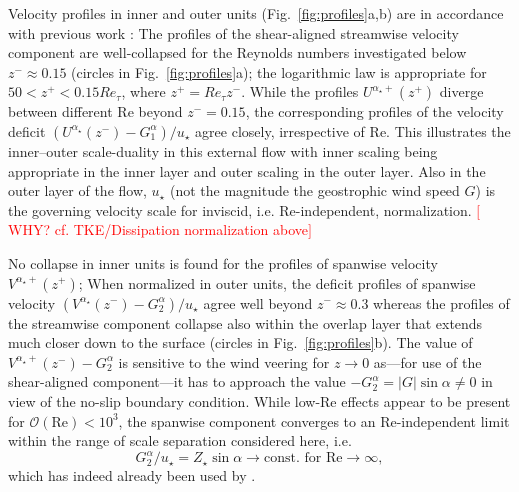 \documentclass[a4paper,11pt]{amsart}
\newcommand{\todo}[1]{\textcolor{red}{$[$#1$]$}}
\newcommand{\RE}{\mathrm{Re}}
\begin{document}
%
\par
%
Velocity profiles in inner and outer units (Fig.~\ref{fig:profiles}a,b) are in accordance
with previous work \citep{coleman:JFM1992,spalart:PF2008,spalart:PF2009,ansorge:BM2014,ansorge:BM2019}:
%
The profiles of the shear-aligned streamwise velocity component are well-collapsed for the Reynolds
numbers investigated below $z^-\approx 0.15$ (circles in Fig.~\ref{fig:profiles}a); the logarithmic
law is appropriate for $50 < z^+ < 0.15 Re_\tau$, where $z^+ = Re_\tau z^-$.
%
While the profiles $U^{\alpha_\star+}(z^+)$ diverge between different $\RE$ beyond $z^-=0.15$,
the corresponding profiles of the velocity deficit  $(U^{\alpha_\star}(z^-) - G_{1}^{\alpha} ) /u_\star$
agree closely, irrespective of $\RE$.
%
This illustrates the inner--outer scale-duality in this external flow with inner scaling being
appropriate in the inner layer and outer scaling in the outer layer. 
%
Also in the outer layer of the flow, $u_\star$ (not the magnitude the
geostrophic wind speed $G$) is the governing velocity scale for inviscid, i.e. $\RE$-independent,
normalization. \todo{WHY? cf. TKE/Dissipation normalization above}
%
\par
%
No collapse in inner units is found for the profiles of spanwise velocity $V^{\alpha_\star+}(z^+)$;
%
When normalized in outer units, the deficit profiles of spanwise velocity
$(V^{\alpha_\star}(z^-)-G_{2}^{\alpha})/u_\star$
agree well beyond $z^-\approx 0.3$ whereas the profiles of the streamwise component collapse also
within the overlap layer that extends much closer down to the surface
(circles in Fig.~\ref{fig:profiles}b).
%
The value of $V^{\alpha_\star+}(z^-)-G_{2}^{\alpha}$ is sensitive to the wind veering for
$z\rightarrow 0$ as---for use of the shear-aligned component---it has to approach the value
$-G_2^\alpha=|G|\sin\alpha\ne0$ in view of the no-slip boundary condition.  
%
While low-$\RE$ effects appear to be present for $\mathcal{O}(\RE)<10^3$, the spanwise component
converges to an $\RE$-independent limit within the range of scale separation considered
here, i.e.
\begin{equation}
  G_{2}^{\alpha}/u_\star = Z_\star \sin\alpha \rightarrow \text{const. for\ }\RE\rightarrow \infty, 
\end{equation}
which has indeed already been used by \cite{spalart:JFM1989}. 
%
\par
%
\end{document}
